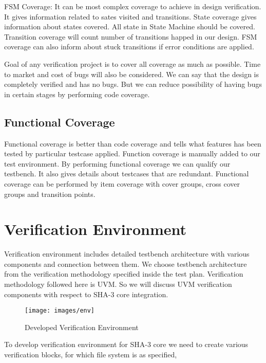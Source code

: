 FSM Coverage: It can be most complex coverage to achieve in design verification. It gives information related to sates visited and transitions. State coverage gives information about states covered. All state in State Machine should be covered. Transition coverage will count number of transitions happed in our design. FSM coverage can also inform about stuck transitions if error conditions are applied. \par

Goal of any verification project is to cover all coverage as much as possible. Time to market and cost of bugs will also be considered. We can say that the design is completely verified and has no bugs. But we can reduce possibility of having bugs in certain stages by performing code coverage.

\subsection{Functional Coverage}

Functional coverage is better than code coverage and tells what features has been tested by particular testcase applied. Function coverage is manually added to our test environment. By performing functional coverage we can qualify our testbench. It also gives details about testcases that are redundant. Functional coverage can be performed by item coverage with cover groups, cross cover groups and transition points.

\section{Verification Environment}

Verification environment includes detailed testbench architecture with various components and connection between them. We choose testbench architecture from the verification methodology specified inside the test plan. Verification methodology followed here is UVM. So we will discuss UVM verification components with respect to SHA-3 core integration.

\vspace{1cm}
\begin{figure}[ht]
	\centering
	\texttt{[image: images/env]}
	\caption{Developed Verification Environment \label{env}}
\end{figure}


To develop verification environment for SHA-3 core we need to create various verification blocks, for which file system is as specified,

